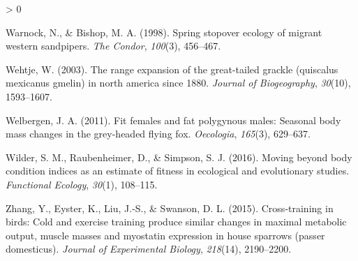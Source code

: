 \documentclass[
]{article}
\newlength{\cslhangindent}
\newenvironment{CSLReferences}[2] %
 {%
  \setlength{\parindent}{0pt}
  \ifodd #1 \everypar{\setlength{\hangindent}{\cslhangindent}}\ignorespaces\fi
  \ifnum #2 > 0
  \setlength{\parskip}{#2\baselineskip}
  \fi
 }%
 {}
\begin{document}
\begin{CSLReferences}{1}{0}
\leavevmode\hypertarget{ref-warnock1998spring}{}%
Warnock, N., \& Bishop, M. A. (1998). Spring stopover ecology of migrant
western sandpipers. \emph{The Condor}, \emph{100}(3), 456--467.

\leavevmode\hypertarget{ref-wehtje2003range}{}%
Wehtje, W. (2003). The range expansion of the great-tailed grackle
(quiscalus mexicanus gmelin) in north america since 1880. \emph{Journal
of Biogeography}, \emph{30}(10), 1593--1607.

\leavevmode\hypertarget{ref-welbergen2011fit}{}%
Welbergen, J. A. (2011). Fit females and fat polygynous males: Seasonal
body mass changes in the grey-headed flying fox. \emph{Oecologia},
\emph{165}(3), 629--637.

\leavevmode\hypertarget{ref-wilder2016moving}{}%
Wilder, S. M., Raubenheimer, D., \& Simpson, S. J. (2016). Moving beyond
body condition indices as an estimate of fitness in ecological and
evolutionary studies. \emph{Functional Ecology}, \emph{30}(1), 108--115.

\leavevmode\hypertarget{ref-zhang2015cross}{}%
Zhang, Y., Eyster, K., Liu, J.-S., \& Swanson, D. L. (2015).
Cross-training in birds: Cold and exercise training produce similar
changes in maximal metabolic output, muscle masses and myostatin
expression in house sparrows (passer domesticus). \emph{Journal of
Experimental Biology}, \emph{218}(14), 2190--2200.

\end{CSLReferences}
\end{document}
